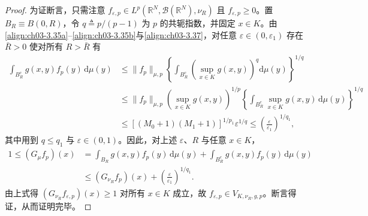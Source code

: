 \documentclass[../../main.tex]{subfiles}%
\begin{document}
\begin{proof}
为证断言，只需注意 $f_{\varepsilon,p}\in L^p(\mathbb{R}^N,\mathcal{B}(\mathbb{R}^N),\nu_R)$ 且 $f_{\varepsilon,p}\geqslant0$。置 $B_R\equiv B(0,R)$，令 $q\triangleq p/(p-1)$ 为 $p$ 的共轭指数，并固定 $x\in K$。由\eqref{align:ch03-3.35a}--\eqref{align:ch03-3.35b}与\eqref{align:ch03-3.37}，对任意 $\varepsilon\in(0,\varepsilon_1)$ 存在 $\bar R>0$ 使对所有 $R>\bar R$ 有
\begin{align*}
\int_{B_R^c}g(x,y)f_p(y)\,\mathrm{d}\mu(y)
&\leqslant\|f_p\|_{\mu,p}\left\{\int_{B_R^c}\left(\sup_{x\in K}g(x,y)\right)^q\mathrm{d}\mu(y)\right\}^{1/q}\\
&\leqslant\|f_p\|_{\mu,p}\left(\sup_{x\in K}g(x,y)\right)^{1/p}\left\{\int_{B_R^c}\sup_{x\in K}g(x,y)\,\mathrm{d}\mu(y)\right\}^{1/q}\\
&\leqslant\left[(M_0+1)(M_1+1)\right]^{1/p_1}\varepsilon^{1/q}\leqslant\left(\frac{\varepsilon}{\varepsilon_1}\right)^{1/q_1},
\end{align*}
其中用到 $q\leqslant q_1$ 与 $\varepsilon\in(0,1)$。因此，对上述 $\varepsilon$、$R$ 与任意 $x\in K$，
\begin{align*}
1\leqslant(G_\mu f_p)(x)&=\int_{B_R}g(x,y)f_p(y)\,\mathrm{d}\mu(y)+\int_{B_R^c}g(x,y)f_p(y)\,\mathrm{d}\mu(y)\\
&\leqslant(G_{\nu_R}f_p)(x)+\left(\frac{\varepsilon}{\varepsilon_1}\right)^{1/q_1}.
\end{align*}
由上式得 $(G_{\nu_R}f_{\varepsilon,p})(x)\geqslant1$ 对所有 $x\in K$ 成立，故 $f_{\varepsilon,p}\in V_{K,\nu_R,g,p}$。断言得证，从而证明完毕。
\end{proof}
\end{document}
